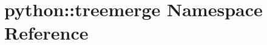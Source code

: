\hypertarget{namespacepython_1_1treemerge}{
\section{python::treemerge Namespace Reference}
\label{namespacepython_1_1treemerge}
}
